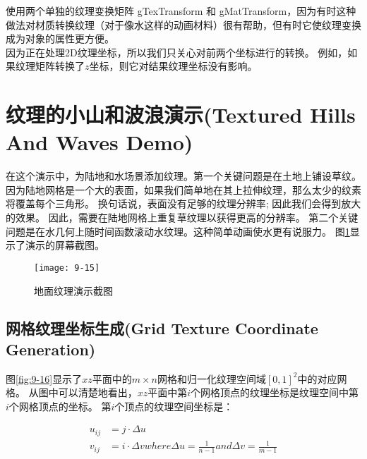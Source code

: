 \begin{flushleft}
使用两个单独的纹理变换矩阵 gTexTransform 和 gMatTransform，因为有时这种做法对材质转换纹理（对于像水这样的动画材料）很有帮助，但有时它使纹理变换成为对象的属性更方便。\\

因为正在处理2D纹理坐标，所以我们只关心对前两个坐标进行的转换。 例如，如果纹理矩阵转换了$z$坐标，则它对结果纹理坐标没有影响。\\
\end{flushleft}

\section{纹理的小山和波浪演示(Textured Hills And Waves Demo)}
\begin{flushleft}
在这个演示中，为陆地和水场景添加纹理。第一个关键问题是在土地上铺设草纹。 因为陆地网格是一个大的表面，如果我们简单地在其上拉伸纹理，那么太少的纹素将覆盖每个三角形。 换句话说，表面没有足够的纹理分辨率; 因此我们会得到放大的效果。 因此，需要在陆地网格上重复草纹理以获得更高的分辨率。 第二个关键问题是在水几何上随时间函数滚动水纹理。这种简单动画使水更有说服力。 图\ref{fig:9-15}显示了演示的屏幕截图。\\
\end{flushleft}

\begin{figure}[h]
    \label{fig:9-15}
    \texttt{[image: 9-15]}
    \centering
    \caption{地面纹理演示截图}
\end{figure}

\subsection{网格纹理坐标生成(Grid Texture Coordinate Generation)}
\begin{flushleft}
图\ref{fig:9-16}显示了$xz$平面中的$m\times n$网格和归一化纹理空间域$[0,1]^{2}$中的对应网格。 从图中可以清楚地看出，$xz$平面中第$i$个网格顶点的纹理坐标是纹理空间中第$i$个网格顶点的坐标。 第$i$个顶点的纹理空间坐标是：\\
\end{flushleft}

\begin{align*}
u_{ij}&=j\cdot \Delta u\\
v_{ij}&=i\cdot \Delta v
where \Delta u=\frac{1}{n-1} and \Delta v=\frac{1}{m-1}
\end{align*}

